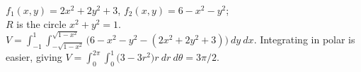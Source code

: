 {$f_1(x,y) = 2x^2+2y^2+3$, $f_2(x,y) = 6-x^2-y^2$;\\
$R$ is the circle $x^2+y^2=1$.
}
{$V = \int_{-1}^{1}\int_{-\sqrt{1-x^2}}^{\sqrt{1-x^2}} \big(6-x^2-y^2-(2x^2+2y^2+3))\ dy\ dx$. Integrating in polar is easier, giving $V = \int_0^{2\pi}\int_0^1 \big(3-3r^2\big)r\ dr\ d\theta = 3\pi/2$.
}
